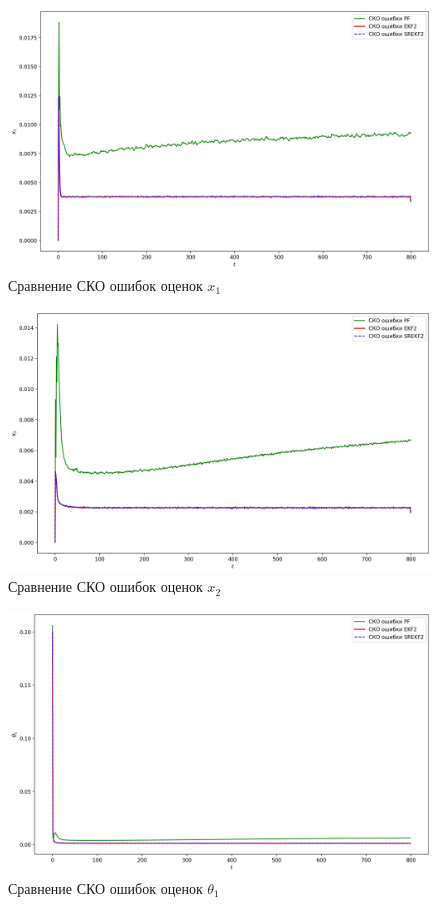 \documentclass[a4paper,12pt]{article}
\begin{document}
\begin{landscape}
\begin{figure}[p]
\centering
\caption{Сравнение СКО ошибок оценок $x_1$}
\includegraphics[width=0.95\linewidth]{RMSE_x1.png}

\end{figure}

\begin{figure}[p]
\centering
\caption{Сравнение СКО ошибок оценок $x_2$}
\includegraphics[width=0.95\linewidth]{RMSE_x2.png}

\end{figure}

\begin{figure}[p]
\centering
\caption{Сравнение СКО ошибок оценок $\theta_1$}
\includegraphics[width=0.95\linewidth]{RMSE_theta1.png}


\end{figure}
\end{landscape}
\end{document}
